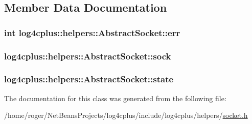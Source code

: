 \subsection{Member Data Documentation}
\hypertarget{classlog4cplus_1_1helpers_1_1AbstractSocket_a26ff3fef10b1f1a6e50d41e78141bb4c}{
\subsubsection[{err}]{\setlength{\rightskip}{0pt plus 5cm}int log4cplus\-::helpers\-::\-Abstract\-Socket\-::err\hspace{0.3cm}{\ttfamily [protected]}}}\label{classlog4cplus_1_1helpers_1_1AbstractSocket_a26ff3fef10b1f1a6e50d41e78141bb4c}
\hypertarget{classlog4cplus_1_1helpers_1_1AbstractSocket_af94ee3bfaba254e722bdd55429b61393}{
\subsubsection[{sock}]{ log4cplus\-::helpers\-::\-Abstract\-Socket\-::sock\hspace{0.3cm}{\ttfamily [protected]}}}\label{classlog4cplus_1_1helpers_1_1AbstractSocket_af94ee3bfaba254e722bdd55429b61393}
\hypertarget{classlog4cplus_1_1helpers_1_1AbstractSocket_a145f2db82d4ab080a5e114606b79b4c9}{
\subsubsection[{state}]{ log4cplus\-::helpers\-::\-Abstract\-Socket\-::state\hspace{0.3cm}{\ttfamily [protected]}}}\label{classlog4cplus_1_1helpers_1_1AbstractSocket_a145f2db82d4ab080a5e114606b79b4c9}


The documentation for this class was generated from the following file\-:\begin{DoxyCompactItemize}
\item 
/home/roger/\-Net\-Beans\-Projects/log4cplus/include/log4cplus/helpers/\hyperlink{helpers_2socket_8h}{socket.\-h}\end{DoxyCompactItemize}
